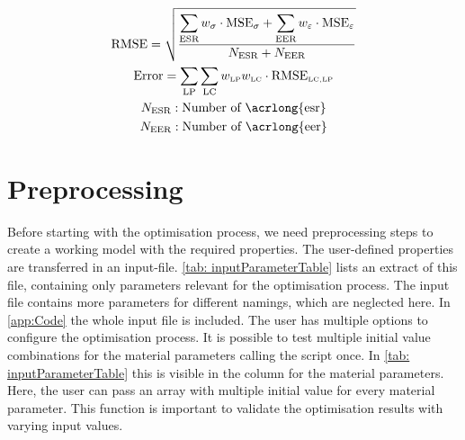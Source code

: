 \begin{gather}
    \label{eq: rmse}
        \text{RMSE} = \sqrt{\frac{\displaystyle\sum_{\text{ESR}} w_{\sigma} \cdot \text{MSE}_{\sigma} + \displaystyle\sum_{\text{EER}} w_{\varepsilon} \cdot \text{MSE}_{\varepsilon}}{N_\text{ESR} + N_\text{EER}}} \\
        \label{eq: error}
    \text{Error} = \sum_{\text{LP}} \sum_{\text{LC}} w_{\scriptscriptstyle\text{LP}} w_{\scriptscriptstyle\text{LC}} \cdot \text{RMSE}_{\scriptscriptstyle \text{LC}, \text{LP}} \\
        N_\text{ESR}: \text{Number of \acrlong{esr}} \nonumber\\
    N_\text{EER}: \text{Number of \acrlong{eer}} \nonumber
\end{gather}


\section{Preprocessing} \label{sec: preprocessing}
Before starting with the optimisation process, we need preprocessing steps to create a working  model with the required properties. The user-defined properties are transferred in an input-file. \autoref{tab: inputParameterTable} lists an extract of this file, containing only parameters relevant for the optimisation process.
The input file contains more parameters for different namings, which are neglected here. In \autoref{app:Code} the whole input file is included. 
The user has multiple options to configure the optimisation process. It is possible to test multiple initial value combinations for the material parameters calling the script once. In \autoref{tab: inputParameterTable} this is visible in the column  for the material parameters.
Here, the user can pass an array with multiple initial value for every material parameter.
This function is important to validate the optimisation results with varying input values. 
